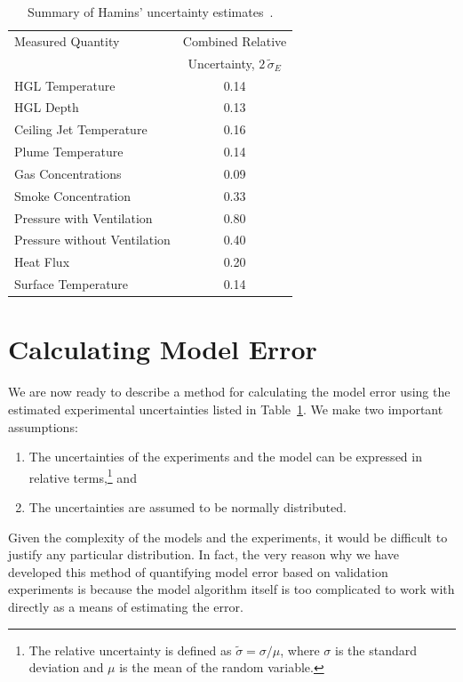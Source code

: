 \begin{table}[t]
\caption{Summary of Hamins' uncertainty estimates~\cite{NUREG_1824}. }
\begin{center}
\begin{tabular}{|l|c|}
\hline
Measured Quantity               & Combined Relative       \\
                                & Uncertainty, $2 \, \widetilde{\sigma}_E$       \\ \hline \hline
HGL Temperature                 & 0.14    \\ \hline
HGL Depth                       & 0.13    \\ \hline
Ceiling Jet Temperature         & 0.16    \\ \hline
Plume Temperature               & 0.14    \\ \hline
Gas Concentrations              & 0.09     \\ \hline
Smoke Concentration             & 0.33    \\ \hline
Pressure with Ventilation       & 0.80    \\ \hline
Pressure without Ventilation    & 0.40    \\ \hline
Heat Flux                       & 0.20    \\ \hline
Surface Temperature             & 0.14    \\ \hline
\end{tabular}
\end{center}
\label{Uncertainty}
\end{table}


\section{Calculating Model Error}

We are now ready to describe a method for calculating the model error using the estimated experimental uncertainties
listed in Table~\ref{Uncertainty}.
We make two important assumptions:
\begin{enumerate}
\item The uncertainties of the experiments and the model can be expressed in
relative terms,\footnote{The relative uncertainty is defined as
$\widetilde{\sigma}=\sigma/\mu$, where $\sigma$ is the standard deviation and $\mu$ is the mean of the random variable.} and
\item The uncertainties are assumed to be normally distributed.
\end{enumerate}
Given the complexity of the models and the experiments, it would be difficult to justify
any particular distribution. In fact, the very reason why we have developed this method of quantifying model error based on validation
experiments is because the model algorithm itself is too complicated to work with directly as a means of estimating the error.

